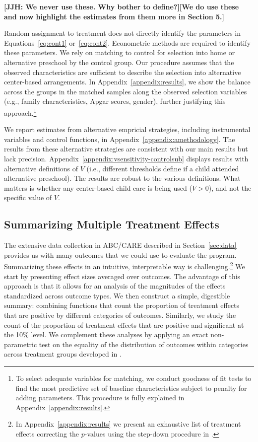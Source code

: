\textbf{[JJH: We never use these. Why bother to define?][We do use these and now highlight the estimates from them more in Section 5.]}

Random assignment to treatment does not directly identify the parameters in Equations~\eqref{eq:cont1} or~\eqref{eq:cont2}. Econometric methods are required to identify these parameters. We rely on matching to control for selection into home or alternative preschool by the control group. Our procedure assumes that the observed characteristics are sufficient to describe the selection into alternative center-based arrangements. In Appendix~\ref{appendix:results}, we show the balance across the groups in the matched samples along the observed selection variables (e.g., family characteristics, Apgar scores, gender), further justifying this approach.\footnote{To select adequate variables for matching, we conduct goodness of fit tests to find the most predictive set of baseline characteristics subject to penalty for adding parameters. This procedure is fully explained in Appendix~\ref{appendix:results}.}

We report estimates from alternative empricial strategies, including instrumental variables and control functions, in Appendix~\ref{appendix:amethodology}. The results from these alternative strategies are consistent with our main results but lack precision. Appendix~\ref{appendix:vsensitivity-controlsub} displays results with alternative definitions of $V$ (i.e., different thresholds define if a child attended alternative preschool). The results are robust to the various definitions. What matters is whether any center-based child care is being used ($V>0$), and not the specific value of $V$.

\subsection{Summarizing Multiple Treatment Effects}\label{sec:combining-functions}

The extensive data collection in ABC/CARE described in Section~\ref{sec:data} provides us with many outcomes that we could use to evaluate the program. Summarizing these effects in an intuitive, interpretable way is challenging.\footnote{In Appendix~\ref{appendix:results} we present an exhaustive list of treatment effects correcting the $p$-values using the step-down procedure in \citet{Romano_Wolf_2016_pval_SaPL}.} We start by presenting effect sizes averaged over outcomes. The advantage of this approach is that it allows for an analysis of the magnitudes of the effects standardized across outcome types. We then construct a simple, digestible summary: combining functions that count the proportion of treatment effects that are positive by different categories of outcomes. Similarly, we study the count of the proportion of treatment effects that are positive and significant at the 10\% level. We complement these analyses by applying an exact non-parametric test on the equality of the distribution of outcomes within categories across treatment groups developed in \citet{Rosenbaum_2005_Distribution_JRSS}.

